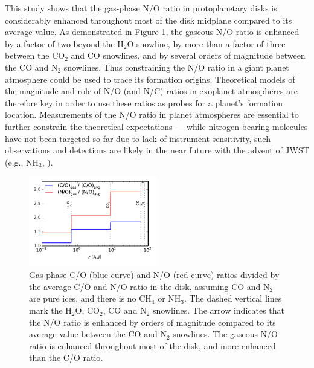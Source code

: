 \documentclass[apj]{emulateapj}
\newcommand{\emgr}[1]{\emph{ \color{gray} #1}}
\begin{document}
This study shows that the gas-phase N/O ratio in protoplanetary disks is considerably enhanced throughout most of the disk midplane compared to its average value. As demonstrated in Figure \ref{fig:enhance}, the gaseous N/O ratio is enhanced by a factor of two beyond the H$_2$O snowline, by more than a factor of three between the CO$_2$ and CO snowlines, and by several orders of magnitude between the CO and N$_2$ snowlines. Thus constraining the N/O ratio in a giant planet atmosphere could be used to trace its formation origins. Theoretical models of the magnitude and role of N/O (and N/C) ratios in exoplanet atmospheres are therefore key in order to use these ratios as probes for a planet's formation location. Measurements of the N/O ratio in planet atmospheres are essential to further constrain the theoretical expectations --- while nitrogen-bearing molecules have not been targeted so far due to lack of instrument sensitivity, such observations and detections are likely in the near future with the advent of JWST (e.g., NH$_3$, \citealt{greene16}).

\begin{figure}[h!]
\centering
\includegraphics[width=0.5\textwidth]{CN_norm.pdf}
\caption{Gas phase C/O (blue curve) and N/O (red curve) ratios divided by the average C/O and N/O ratio in the disk, assuming CO and N$_2$ are pure ices, and there is no CH$_4$ or NH$_3$. The dashed vertical lines mark the H$_2$O, CO$_2$, CO and N$_2$ snowlines. The arrow indicates that the N/O ratio is enhanced by orders of magnitude compared to its average value between the CO and N$_2$ snowlines. The gaseous N/O ratio is enhanced throughout most of the disk, and more enhanced than the C/O ratio.}  
\label{fig:enhance}
\end{figure}
\end{document}
